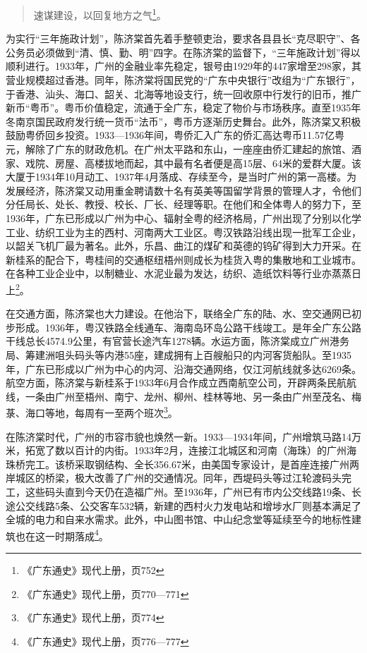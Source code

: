 \begin{quote}
速谋建设，以回复地方之气\footnote{《广东通史》现代上册，页752}。
\end{quote}

为实行“三年施政计划”，陈济棠首先着手整顿吏治，要求各县县长“克尽职守”、各公务员必须做到“清、慎、勤、明”四字。在陈济棠的监督下，“三年施政计划”得以顺利进行。1933年，广州的金融业率先稳定，银号由1929年的447家增至298家，其营业规模超过香港。同年，陈济棠将国民党的“广东中央银行”改组为“广东银行”，于香港、汕头、海口、韶关、北海等地设支行，统一回收原中行发行的旧币，推广新币“粤币”。粤币价值稳定，流通于全广东，稳定了物价与市场秩序。直至1935年冬南京国民政府发行统一货币“法币”，粤币方逐渐历史舞台。此外，陈济棠又积极鼓励粤侨回乡投资。1933—1936年间，粤侨汇入广东的侨汇高达粤币11.57亿粤元，解除了广东的财政危机。在广州太平路和东山，一座座由侨汇建起的旅馆、酒家、戏院、房屋、高楼拔地而起，其中最有名者便是高15层、64米的爱群大厦。该大厦于1934年10月动工、1937年4月落成、存续至今，是当时广州的第一高楼。为发展经济，陈济棠又动用重金聘请数十名有英美等国留学背景的管理人才，令他们分任局长、处长、教授、校长、厂长、经理等职。在他们和全体粤人的努力下，至1936年，广东已形成以广州为中心、辐射全粤的经济格局，广州出现了分别以化学工业、纺织工业为主的西村、河南两大工业区。粤汉铁路沿线出现一批军工企业，以韶关飞机厂最为著名。此外，乐昌、曲江的煤矿和英德的钨矿得到大力开采。在新桂系的配合下，粤桂间的交通枢纽梧州则成长为桂货入粤的集散地和工业城市。在各种工业企业中，以制糖业、水泥业最为发达，纺织、造纸饮料等行业亦蒸蒸日上\footnote{《广东通史》现代上册，页770—771}。

在交通方面，陈济棠也大力建设。在他治下，联络全广东的陆、水、空交通网已初步形成。1936年，粤汉铁路全线通车、海南岛环岛公路干线竣工。是年全广东公路干线总长4574.9公里，有官营长途汽车1278辆。水运方面，陈济棠成立广州港务局、筹建洲咀头码头等内港55座，建成拥有上百艘船只的内河客货船队。至1935年，广东已形成以广州为中心的内河、沿海交通网络，仅江河航线就多达6269条。航空方面，陈济棠与新桂系于1933年6月合作成立西南航空公司，开辟两条民航航线，一条由广州至梧州、南宁、龙州、柳州、桂林等地、另一条由广州至茂名、梅菉、海口等地，每周有一至两个班次\footnote{《广东通史》现代上册，页774}。

在陈济棠时代，广州的市容市貌也焕然一新。1933—1934年间，广州增筑马路14万米，拓宽了数以百计的内街。1933年2月，连接江北城区和河南（海珠）的广州海珠桥完工。该桥采取钢结构、全长356.67米，由美国专家设计，是首座连接广州两岸城区的桥梁，极大改善了广州的交通情况。同年，西堤码头等过江轮渡码头完工，这些码头直到今天仍在造福广州。至1936年，广州已有市内公交线路19条、长途公交线路5条、公交客车532辆，新建的西村火力发电站和增埗水厂则基本满足了全城的电力和自来水需求。此外，中山图书馆、中山纪念堂等延续至今的地标性建筑也在这一时期落成\footnote{《广东通史》现代上册，页776—777}。

